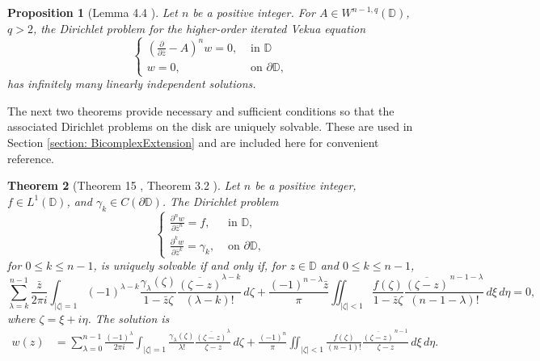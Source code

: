 \documentclass[12pt,reqno]{amsart}
\newtheorem{theorem}{Theorem}[section]
\newtheorem{prop}[theorem]{Proposition}
\theoremstyle{definition}
\theoremstyle{remark}
\newcommand{\p}{\partial}
\newcommand{\z}{\bar z}
\newcommand{\disk}{\mathbb{D}}
\begin{document}
           

        \begin{prop}[Lemma 4.4 \cite{WBD2}]\label{prop: generalbitsadzelindepextension}
                Let $n$ be a positive integer. For $A \in W^{n-1,q}(\disk)$, $q>2$, the Dirichlet problem for the higher-order iterated Vekua equation
                \begin{equation}
                    \begin{cases}
                    \left( \frac{\p}{\p\z} - A\right)^n w = 0, & \text{ in } \disk\\
                    w = 0, & \text{ on } \p \disk,
                    \end{cases}
                \end{equation}
                has infinitely many linearly independent solutions.
        \end{prop}

            The next two theorems provide necessary and sufficient conditions so that the associated Dirichlet problems on the disk are uniquely solvable. These are used in Section \ref{section: BicomplexExtension} and are included here for convenient reference. 

                \begin{theorem}[Theorem 15 \cite{BegBVPCA2}, Theorem 3.2 \cite{Karaca20}]\label{thm: complexhigherorderdirichletdisk}
                    Let $n$ be a positive integer, $f \in L^1(\disk)$, and $\gamma_k \in C(\p\disk)$. The Dirichlet problem
                    \[
                        \begin{cases}
                            \frac{\p^n w}{\p \z^n} = f, &\text{ in } \disk,\\
                            \frac{\p^k w}{\p \z^k} = \gamma_k, & \text{ on } \p\disk,
                        \end{cases}
                    \]
                    for $0 \leq k \leq n-1$, is uniquely solvable if and only if, for $z \in \disk$ and $0 \leq k \leq n-1$, 
                    \[
                        \sum_{\lambda = k}^{n-1} \frac{\z}{2\pi i} \int_{|\zeta|=1} (-1)^{\lambda - k}\frac{\gamma_{\lambda}(\zeta)}{1-\z\zeta} \frac{\overline{(\zeta - z)}^{\lambda-k}}{(\lambda -k)!}\,d\zeta + \frac{(-1)^{n-\lambda}\z}{\pi} \iint_{|\zeta|<1}\frac{f(\zeta)}{1-\z\zeta} \frac{\overline{(\zeta-z)}^{\,n-1-\lambda}}{(n-1-\lambda)!}\,d\xi\,d\eta = 0,
                    \]
                    where $\zeta = \xi + i\eta$.
                    The solution is 
                    \begin{align*}
                        w(z) &= \sum_{\lambda = 0}^{n-1} \frac{(-1)^\lambda}{2\pi i} \int_{|\zeta|=1} \frac{\gamma_\lambda(\zeta)}{\lambda!} \frac{\overline{(\zeta - z)}^\lambda}{\zeta - z}\,d\zeta + \frac{(-1)^n}{\pi} \iint_{|\zeta|<1} \frac{f(\zeta)}{(n-1)!} \frac{\overline{(\zeta -z)}^{\,n-1}}{\zeta -z}\,d\xi\,d\eta.
                    \end{align*}
                \end{theorem}
\end{document}
